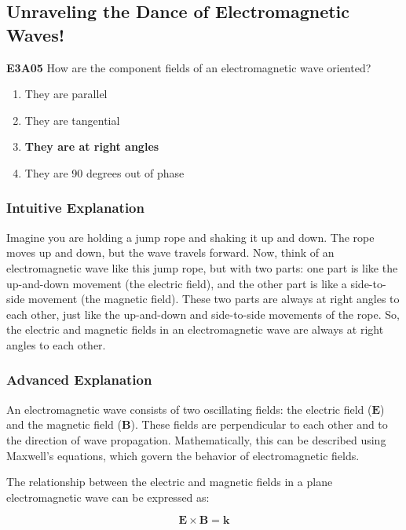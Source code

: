 \subsection{Unraveling the Dance of Electromagnetic Waves!}

\begin{tcolorbox}[colback=gray!10!white,colframe=black!75!black,title=Multiple Choice Question]
\textbf{E3A05} How are the component fields of an electromagnetic wave oriented?

\begin{enumerate}[label=\Alph*.]
    \item They are parallel
    \item They are tangential
    \item \textbf{They are at right angles}
    \item They are 90 degrees out of phase
\end{enumerate}
\end{tcolorbox}

\subsubsection*{Intuitive Explanation}
Imagine you are holding a jump rope and shaking it up and down. The rope moves up and down, but the wave travels forward. Now, think of an electromagnetic wave like this jump rope, but with two parts: one part is like the up-and-down movement (the electric field), and the other part is like a side-to-side movement (the magnetic field). These two parts are always at right angles to each other, just like the up-and-down and side-to-side movements of the rope. So, the electric and magnetic fields in an electromagnetic wave are always at right angles to each other.

\subsubsection*{Advanced Explanation}
An electromagnetic wave consists of two oscillating fields: the electric field (\(\mathbf{E}\)) and the magnetic field (\(\mathbf{B}\)). These fields are perpendicular to each other and to the direction of wave propagation. Mathematically, this can be described using Maxwell's equations, which govern the behavior of electromagnetic fields. 

The relationship between the electric and magnetic fields in a plane electromagnetic wave can be expressed as:

\[
\mathbf{E} \times \mathbf{B} = \mathbf{k}
\]

